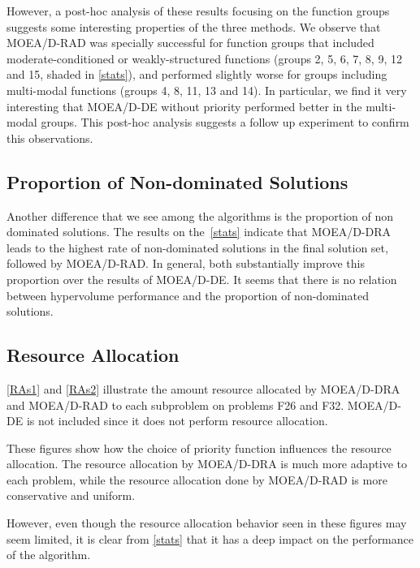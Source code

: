 However, a post-hoc analysis of these results focusing on the function groups
suggests some interesting properties of the three methods. We observe that
MOEA/D-RAD was specially successful for function groups that included
moderate-conditioned or weakly-structured functions (groups 2, 5, 6, 7, 8, 9, 12 and
15, shaded in \ref{stats}), and performed slightly worse for groups including
multi-modal functions (groups 4, 8, 11, 13 and 14). In particular, we find it  very
interesting that MOEA/D-DE without priority performed better in the multi-modal
groups. This post-hoc analysis suggests a follow up experiment to confirm this
observations.

\subsection{Proportion of Non-dominated Solutions}

Another difference that we see among the algorithms  is the proportion of non
dominated solutions. The results on the~\ref{stats} indicate that MOEA/D-DRA
leads to the highest rate of non-dominated solutions in the final solution set,
followed by MOEA/D-RAD. In general, both substantially improve this proportion
over the results of MOEA/D-DE.  It seems that there is no relation between
hypervolume performance and the proportion of non-dominated solutions.


\subsection{Resource Allocation}


\ref{RAs1} and \ref{RAs2} illustrate the amount resource allocated by MOEA/D-DRA
and MOEA/D-RAD to each subproblem on problems F26 and F32. MOEA/D-DE is
not included since it does not perform resource allocation.

These figures show how the choice of priority function influences the
resource allocation. The resource allocation by MOEA/D-DRA is much more
adaptive to each problem, while the resource allocation done by
MOEA/D-RAD is more conservative and uniform.

However, even though the resource allocation behavior seen in these figures
may seem limited, it is clear from \ref{stats} that it has a deep impact on
the performance of the algorithm.
